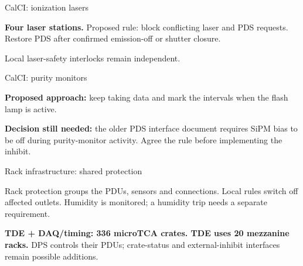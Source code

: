 \documentclass[aspectratio=169,11pt]{beamer}
\begin{document}
\begin{frame}{CalCI: ionization lasers}
\centering
{}\par\bigskip
\raggedright

\textbf{Four laser stations.} Proposed rule: block conflicting laser and PDS requests. Restore PDS after confirmed emission-off or shutter closure.\par\medskip
Local laser-safety interlocks remain independent.
\end{frame}

\begin{frame}{CalCI: purity monitors}
\centering
{}\par\bigskip
\raggedright

\textbf{Proposed approach:} keep taking data and mark the intervals when the flash lamp is active.\par\bigskip
\textbf{Decision still needed:} the older PDS interface document requires SiPM bias to be off during purity-monitor activity. Agree the rule before implementing the inhibit.
\end{frame}

\begin{frame}{Rack infrastructure: shared protection}
\centering
{}\par\medskip
\raggedright

Rack protection groups the PDUs, sensors and connections. Local rules switch off affected outlets. Humidity is monitored; a humidity trip needs a separate requirement.\par\medskip
\textbf{TDE + DAQ/timing: 336 microTCA crates. TDE uses 20 mezzanine racks.} DPS controls their PDUs; crate-status and external-inhibit interfaces remain possible additions.
\end{frame}
\end{document}
